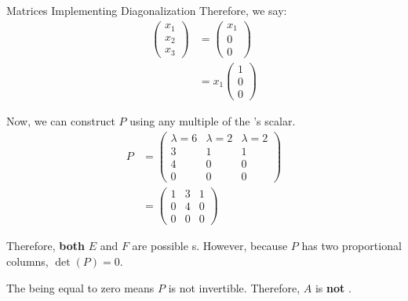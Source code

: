 \begin{example}{Matrices Implementing Diagonalization}
  Therefore, we say:
  \begin{align*}
    \begin{pmatrix}
      x_{1} \\ x_{2} \\ x_{3}
    \end{pmatrix} &=
                    \begin{pmatrix}
                      x_{1} \\ 0 \\ 0
                    \end{pmatrix} \\
    &= x_{1}
      \begin{pmatrix}
        1 \\ 0 \\ 0
      \end{pmatrix}
  \end{align*}

  Now, we can construct $P$ using any multiple of the 's scalar.
  \begin{align*}
    P &=
        \begin{pmatrix}
          \lambda = 6 & \lambda = 2 & \lambda = 2 \\
          3 & 1 & 1 \\
          4 & 0 & 0 \\
          0 & 0 & 0
        \end{pmatrix} \\
    &=
      \begin{pmatrix}
        1 & 3 & 1 \\
        0 & 4 & 0 \\
        0 & 0 & 0
      \end{pmatrix}
  \end{align*}

  Therefore, \textbf{both} $E$ and $F$ are possible s.
  However, because $P$ has two proportional columns, $\det(P) = 0$.

  The  being equal to zero means $P$ is not invertible.
  Therefore, $A$ is \textbf{not} .
\end{example}

